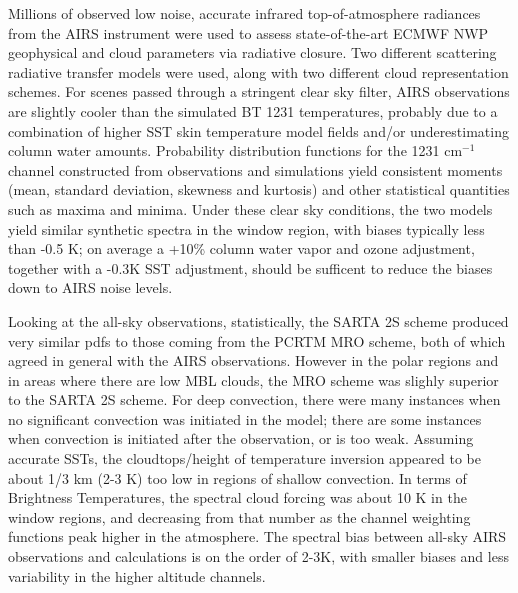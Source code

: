 \documentclass[agupp]{aguplus}              %
\newcommand{\wn}{cm$^{-1}$\xspace}
\begin{document}
\begin{article}
Millions of observed low noise, accurate infrared top-of-atmosphere
radiances from the AIRS instrument were used to assess
state-of-the-art ECMWF NWP geophysical and cloud parameters via
radiative closure. Two different scattering radiative transfer models
were used, along with two different cloud representation schemes.  For
scenes passed through a stringent clear sky filter, AIRS observations
are slightly cooler than the simulated BT 1231 temperatures, probably
due to a combination of higher SST skin temperature model fields
and/or underestimating column water amounts.  Probability distribution
functions for the 1231 \wn channel constructed from observations and
simulations yield consistent moments (mean, standard deviation,
skewness and kurtosis) and other statistical quantities such as maxima
and minima. Under these clear sky conditions, the two models yield
similar synthetic spectra in the window region, with biases typically less
than -0.5 K; on average a +10\% column water vapor and ozone adjustment, 
together with a -0.3K SST adjustment, should be sufficent to reduce the biases
down to AIRS noise levels. 

Looking at the all-sky observations, statistically, the SARTA 2S
scheme produced very similar pdfs to those coming from the PCRTM MRO
scheme, both of which agreed in general with the AIRS
observations. However in the polar regions and in areas where there
are low MBL clouds, the MRO scheme was slighly superior to the SARTA
2S scheme. For deep convection, there were many instances when no
significant convection was initiated in the model; there are some
instances when convection is initiated after the observation, or is
too weak. Assuming accurate SSTs, the cloudtops/height of temperature
inversion appeared to be about 1/3 km (2-3 K) too low in regions of
shallow convection. In terms of Brightness Temperatures, the spectral
cloud forcing was about 10 K in the window regions, and decreasing from
that number as the channel weighting functions peak higher in the
atmosphere. The spectral bias between all-sky AIRS observations and
calculations is on the order of 2-3K, with smaller biases and 
less variability in the higher altitude channels. 
 

\end{article}
\end{document}
